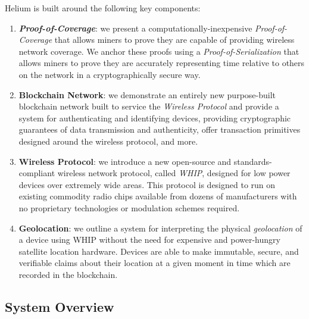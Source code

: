 \documentclass[letterpaper,11pt]{article}
\begin{document}
Helium is built around the following key components:

\begin{enumerate}
  \item \textbf{\emph{Proof-of-Coverage}}: we present a computationally-inexpensive \emph{Proof-of-Coverage} that allows miners to prove they are capable of providing wireless network coverage. We anchor these proofs using a \emph{Proof-of-Serialization} that allows miners to prove they are accurately representing time relative to others on the network in a cryptographically secure way.

  \item \textbf{Blockchain Network}: we demonstrate an entirely new purpose-built blockchain network built to service the \emph{Wireless Protocol} and provide a system for authenticating and identifying devices, providing cryptographic guarantees of data transmission and authenticity, offer transaction primitives designed around the wireless protocol, and more.

    \item \textbf{Wireless Protocol}: we introduce a new open-source and standards-compliant wireless network protocol, called \emph{WHIP}, designed for low power devices over extremely wide areas. This protocol is designed to run on existing commodity radio chips available from dozens of manufacturers with no proprietary technologies or modulation schemes required.

    \item \textbf{Geolocation}: we outline a system for interpreting the physical \emph{geolocation} of a device using WHIP without the need for expensive and power-hungry satellite location hardware. Devices are able to make immutable, secure, and verifiable claims about their location at a given moment in time which are recorded in the blockchain.
\end{enumerate}

\subsection{System Overview}
\end{document}
